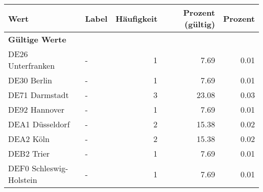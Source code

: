      \begin{longtable}{Xlrrr}
     \toprule
     \textbf{Wert} & \textbf{Label} & \textbf{Häufigkeit} & \textbf{Prozent (gültig)} & \textbf{Prozent} \\
     \endhead
     \midrule
     \multicolumn{5}{l}{\textbf{Gültige Werte}}\\

     \multicolumn{1}{X}{DE26 Unterfranken} &
     - &
     \num{1} &
     \num[round-mode=places,round-precision=2]{7.69} &
     \num[round-mode=places,round-precision=2]{0.01} \\

     \multicolumn{1}{X}{DE30 Berlin} &
     - &
     \num{1} &
     \num[round-mode=places,round-precision=2]{7.69} &
     \num[round-mode=places,round-precision=2]{0.01} \\

     \multicolumn{1}{X}{DE71 Darmstadt} &
     - &
     \num{3} &
     \num[round-mode=places,round-precision=2]{23.08} &
     \num[round-mode=places,round-precision=2]{0.03} \\

     \multicolumn{1}{X}{DE92 Hannover} &
     - &
     \num{1} &
     \num[round-mode=places,round-precision=2]{7.69} &
     \num[round-mode=places,round-precision=2]{0.01} \\

     \multicolumn{1}{X}{DEA1 Düsseldorf} &
     - &
     \num{2} &
     \num[round-mode=places,round-precision=2]{15.38} &
     \num[round-mode=places,round-precision=2]{0.02} \\

     \multicolumn{1}{X}{DEA2 Köln} &
     - &
     \num{2} &
     \num[round-mode=places,round-precision=2]{15.38} &
     \num[round-mode=places,round-precision=2]{0.02} \\

     \multicolumn{1}{X}{DEB2 Trier} &
     - &
     \num{1} &
     \num[round-mode=places,round-precision=2]{7.69} &
     \num[round-mode=places,round-precision=2]{0.01} \\

     \multicolumn{1}{X}{DEF0 Schleswig-Holstein} &
     - &
     \num{1} &
     \num[round-mode=places,round-precision=2]{7.69} &
     \num[round-mode=places,round-precision=2]{0.01} \\


\end{longtable}
